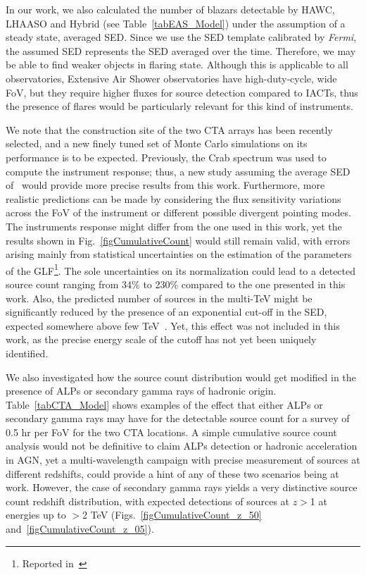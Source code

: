 \documentclass[final,5p]{elsarticle}
\begin{document}
In our work, we also calculated the number of blazars detectable by HAWC, LHAASO and Hybrid (see Table~\ref{tabEAS_Model}) under the assumption of a steady state, averaged SED. Since we use the SED template calibrated by {\it Fermi}, the assumed SED represents the SED averaged over the time. Therefore, we may be able to find weaker objects in flaring state. Although this is applicable to all observatories, Extensive Air Shower observatories have high-duty-cycle, wide FoV, but they require higher fluxes for source detection compared to IACTs, thus the presence of flares would be particularly relevant for this kind of instruments.

We note that the construction site of the two CTA arrays has been recently selected, and a new finely tuned set of Monte Carlo simulations on its performance is to be expected. Previously, the Crab spectrum was used to compute the instrument response; thus, a new study assuming the average SED of~\cite{Ajello2015} would provide more precise results from this work. Furthermore, more realistic predictions can be made by considering the flux sensitivity variations across the FoV of the instrument or different possible divergent pointing modes. The instruments response might differ from the one used in this work, yet the results shown in Fig.~\ref{figCumulativeCount} would still remain valid, with errors arising mainly from statistical uncertainties on the estimation of the parameters of the GLF\footnote{Reported in~\cite{Ajello2015}}. The sole uncertainties on its normalization could lead to a detected source count ranging from 34\% to 230\% compared to the one presented in this work. Also, the predicted number of sources in the multi-TeV might be significantly reduced by the presence of an exponential cut-off in the SED, expected somewhere above few TeV~\cite{Bartoli2012ApJ,Aharonian2003A&A,Krennrich2001ApJ}. Yet, this effect was not included in this work, as the precise energy scale of the cutoff has not yet been uniquely identified. 

We also investigated how the source count distribution would get modified in the presence of ALPs or secondary gamma rays of hadronic origin. Table~\ref{tabCTA_Model} shows examples of the effect that either ALPs or secondary gamma rays may have for the detectable source count for a survey of 0.5 hr per FoV for the two CTA locations. A simple cumulative source count analysis would not be definitive to claim ALPs detection or hadronic acceleration in AGN, yet a multi-wavelength campaign with precise measurement of sources at different redshifts, could provide a hint of any of these two scenarios being at work. However, the case of secondary gamma rays yields a very distinctive source count redshift distribution, with expected detections of sources at $z >$1 at energies up to $>$2 TeV (Figs.~\ref{figCumulativeCount_z_50} and~\ref{figCumulativeCount_z_05}).
\end{document}
